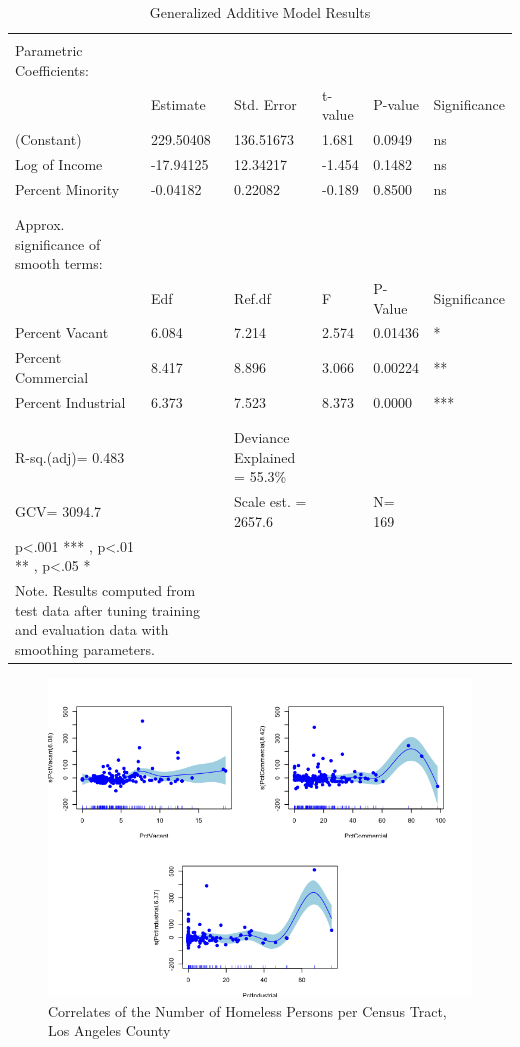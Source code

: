 \documentclass[titlepage]{article}   	%
\begin{document}
\begin{table}
\centering
\caption{Generalized Additive Model Results}
\label{my-label}
\begin{tabular}{llllll}
\\[-1.8ex]\hline 
\hline \\[-1.8ex] 
Parametric Coefficients: &  &  &  &  &  \\ \hline
 & Estimate & Std. Error & t-value & P-value & Significance \\  \hline 
(Constant) & 229.50408 & 136.51673 & 1.681 & 0.0949 & ns \\
Log of Income & -17.94125 & 12.34217 & -1.454 & 0.1482 & ns \\
Percent Minority & -0.04182 & 0.22082 & -0.189 & 0.8500 & ns \\

\\[-1.8ex]\hline 
\hline \\[-1.8ex] 
Approx. significance of smooth terms: &  &  &  &  &  \\ \hline
 & Edf & Ref.df & F & P-Value & Significance \\ \hline
Percent Vacant & 6.084 & 7.214 & 2.574 & 0.01436 & * \\
Percent Commercial & 8.417 & 8.896 & 3.066 & 0.00224 & ** \\
Percent Industrial & 6.373 & 7.523 & 8.373 & 0.0000 & *** \\
\\[-1.8ex]\hline 
\hline \\[-1.8ex] 
R-sq.(adj)= 0.483 &  & Deviance Explained = 55.3\% &  &  &  \\
GCV= 3094.7 &  & Scale est. = 2657.6 &  & N= 169 &  \\ \hline
p\textless.001 *** , p\textless.01 ** , p\textless.05 * &  &  &  &  &  \\ \hline
\multicolumn{2}{p{.5\textwidth}}{Note. Results computed from test data after tuning training and evaluation data with smoothing parameters.}
\end{tabular}
\end{table}

\begin{figure} [h]
\centering
\includegraphics[scale=.65]{GAM_ALL}
\caption{Correlates of the Number of Homeless Persons per Census Tract, Los Angeles County}
\end{figure}
\end{document}
